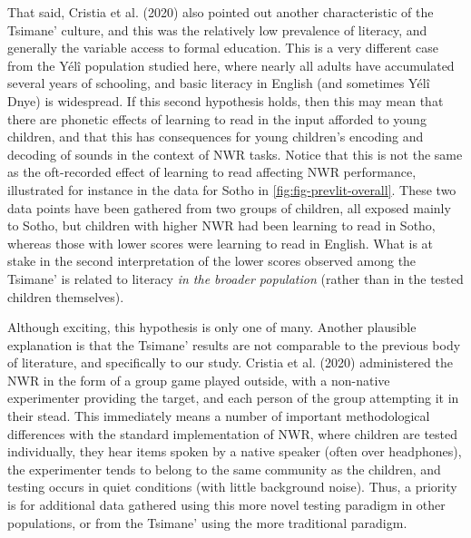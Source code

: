 \documentclass[english,,man,floatsintext]{apa6}
\begin{document}
That said, Cristia et al. (2020) also pointed out another characteristic of the Tsimane' culture, and this was the relatively low prevalence of literacy, and generally the variable access to formal education. This is a very different case from the Yélî population studied here, where nearly all adults have accumulated several years of schooling, and basic literacy in English (and sometimes Yélî Dnye) is widespread. If this second hypothesis holds, then this may mean that there are phonetic effects of learning to read in the input afforded to young children, and that this has consequences for young children's encoding and decoding of sounds in the context of NWR tasks. Notice that this is not the same as the oft-recorded effect of learning to read affecting NWR performance, illustrated for instance in the data for Sotho in \ref{fig:fig-prevlit-overall}. These two data points have been gathered from two groups of children, all exposed mainly to Sotho, but children with higher NWR had been learning to read in Sotho, whereas those with lower scores were learning to read in English. What is at stake in the second interpretation of the lower scores observed among the Tsimane' is related to literacy \emph{in the broader population} (rather than in the tested children themselves).

Although exciting, this hypothesis is only one of many. Another plausible explanation is that the Tsimane' results are not comparable to the previous body of literature, and specifically to our study. Cristia et al. (2020) administered the NWR in the form of a group game played outside, with a non-native experimenter providing the target, and each person of the group attempting it in their stead. This immediately means a number of important methodological differences with the standard implementation of NWR, where children are tested individually, they hear items spoken by a native speaker (often over headphones), the experimenter tends to belong to the same community as the children, and testing occurs in quiet conditions (with little background noise). Thus, a priority is for additional data gathered using this more novel testing paradigm in other populations, or from the Tsimane' using the more traditional paradigm.
\end{document}
